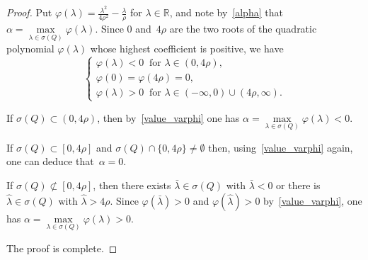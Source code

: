 \documentclass[10pt,a4paper]{amsart}
\begin{document}
\begin{proof}
	Put
	$\varphi(\lambda)=\frac{\lambda^2}{4\rho^2}-\frac{\lambda}{\rho}$ for $\lambda\in\mathbb{R}$, and note by~\eqref{alpha} that  $\alpha=\max\limits_{\lambda\in\sigma(Q)}\varphi(\lambda)$. Since $0$ and~$4\rho$ are the two roots of the quadratic polynomial $\varphi(\lambda)$ whose highest coefficient is positive, we have
	\begin{equation}\label{value_varphi}
		\begin{cases}
			\varphi(\lambda)<0 \ \text{ for } \lambda\in(0,4\rho), \\
			\varphi(0)=\varphi(4\rho)=0, \\
			\varphi(\lambda)>0 \ \text{ for } \lambda\in(-\infty,0)\cup(4\rho,\infty).
		\end{cases}
	\end{equation}
	
If $\sigma(Q)\subset(0,4\rho)$, then by~\eqref{value_varphi} one has $\alpha=\max\limits_{\lambda\in\sigma(Q)}\varphi(\lambda)<0$.

If $\sigma(Q)\subset[0,4\rho]$ and $\sigma(Q)\cap\{0,4\rho\}\neq\emptyset$ then, using~\eqref{value_varphi} again, one can deduce that~$\alpha=0$. 

If $\sigma(Q)\not\subset[0,4\rho]$, then there exists 
 $\bar\lambda\in\sigma(Q)$ with $\bar\lambda<0$ or there is  $\hat\lambda\in\sigma(Q)$ with $\hat\lambda>4\rho$. Since $\varphi(\bar\lambda)>0$ and $\varphi(\hat\lambda)>0$ by~\eqref{value_varphi}, one has
$
\alpha=\max\limits_{\lambda\in\sigma(Q)}\varphi(\lambda)>0.
$

The proof is complete.
\end{proof}
\end{document}
